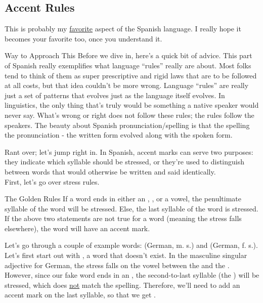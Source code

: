 \subsection{Accent Rules}
\label{subsec:accents}
This is probably my \underline{favorite} aspect of the Spanish language. I really hope it becomes your favorite too, once you understand it.\\

\begin{conf}{Way to Approach This}
	Before we dive in, here's a quick bit of advice. This part of Spanish really exemplifies what language ``rules'' really are about. Most folks tend to think of them as super prescriptive and rigid laws that are to be followed at all costs, but that idea couldn't be more wrong. Language ``rules'' are really just a set of patterns that evolves just as the language itself evolves. In linguistics, the only thing that's truly  would be something a native speaker would never say. What's wrong or right does not follow these rules; the rules follow the speakers. The beauty about Spanish pronunciation/spelling is that the spelling  the pronunciation - the written form evolved along with the spoken form.  
\end{conf}

Rant over; let's jump right in. In Spanish, accent marks can serve two purposes: they indicate which syllable should be stressed, or they're used to distinguish between words that would otherwise be written and said identically. \\

First, let's go over stress rules.\\

\begin{conf}{The Golden Rules}
If a word ends in either an , , or a vowel, the penultimate syllable of the word will be stressed. Else, the last syllable of the word is stressed. If the above two statements are not true for a word (meaning the stress falls elsewhere), the word will have an accent mark.
\end{conf}

Let's go through a couple of example words:  (German, m. s.) and  (German, f. s.).\\

Let's first start out with \sout{}, a word that doesn't exist. In the masculine singular adjective for German, the stress falls on the vowel between the  and the . However, since our fake word  \sout{} ends in an , the second-to-last syllable (the ) will be stressed, which does \underline{not} match the spelling. Therefore, we'll need to add an accent mark on the last syllable, so that we get . \\

